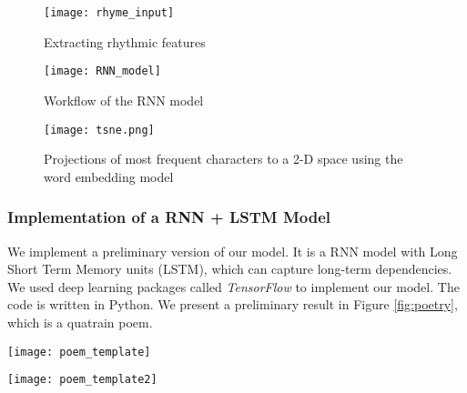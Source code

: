 \begin{figure}[htbp]
	\centering
	\texttt{[image: rhyme\_input]}
	\caption{Extracting rhythmic features}
	\label{fig:rhyme_features}
\end{figure}

\begin{figure}[htbp]
	\centering
	\texttt{[image: RNN\_model]}
	\caption{Workflow of the RNN model}
	\label{fig:rnn_workflow}
\end{figure}

\begin{figure}[htbp]
	\centering
	\texttt{[image: tsne.png]}
	\caption{Projections of most frequent characters to a 2-D space using the word embedding model}
	\label{fig:VSM}
\end{figure}
\subsubsection{ Implementation of a RNN + LSTM Model  }
We implement a preliminary version of our model. It is a RNN model with Long Short Term Memory units (LSTM), which can capture long-term dependencies.
%
We used deep learning packages called \emph{TensorFlow} \cite{tensorflow} to implement our model. The code is written in Python.
%
We present a preliminary result in Figure \ref{fig:poetry}, which is a quatrain poem.
\begin{figure*}[htbp]
	\centering
	\texttt{[image: poem\_template]}
	\caption{A Song Ci generated using LSTM}
	\label{fig:poetry}
\end{figure*}

\begin{figure*}[htbp]
	\centering
	\texttt{[image: poem\_template2]}
	\caption{A Song Ci generated using Genetic Algorithm }
	\label{fig:poetry}
\end{figure*}

